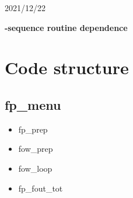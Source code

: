 \documentclass[11pt]{article}
\begin{document}
\begin{flushright}
2021/12/22
\end{flushright}

\begin{center}
\textbf{\Large {}-sequence routine dependence}
\end{center}

\section{Code structure}
\subsection{fp\_menu}
\begin{itemize}
\item
  fp\_prep
\item
  fow\_prep
\item
  fow\_loop
\item
  fp\_fout\_tot
\end{itemize}
\end{document}
